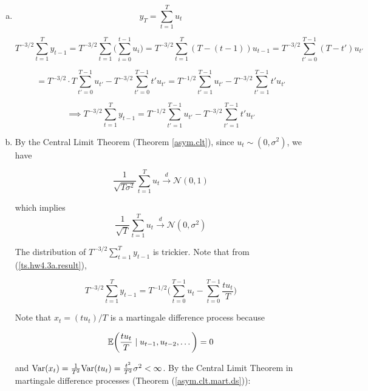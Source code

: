 \begin{enumerate}[(a)]

\item 

\[
y_T = \sum_{t=1}^T u_t
\]

\[
T^{-3/2} \sum_{t=1}^T y_{t-1} = T^{-3/2} \sum_{t=1}^T \bigg( \sum_{i=0}^{t-1} u_i \bigg)  = T^{-3/2} \sum_{t=1}^T(T - (t - 1)) u_{t-1} = T^{-3/2} \sum_{t'=0}^{T-1} (T - t') u_{t'}
\]

\[ 
 =T^{-3/2} \cdot  T \sum_{t'=0}^{T- 1} u_{t'} -  T^{-3/2} \sum_{t'=0}^{T - 1} t' u_{t'}   =T^{-1/2}  \sum_{t'=1}^{T- 1} u_{t'} -  T^{-3/2} \sum_{t'=1}^{T - 1} t' u_{t'} 
\]

\begin{equation} \label{ts.hw4.3a.result}
\implies \boxed{ T^{-3/2} \sum_{t=1}^T y_{t-1} =T^{-1/2}  \sum_{t'=1}^{T- 1} u_{t'} -  T^{-3/2} \sum_{t'=1}^{T - 1} t' u_{t'} }
\end{equation}

\item 

By the Central Limit Theorem (Theorem \ref{asym.clt}), since \(u_t \sim (0, \sigma^2)\),  we have

\[
\frac{1}{\sqrt{T\sigma^2}} \sum_{t=1}^T u_t \xrightarrow{d} \mathcal{N}(0,1)
\]

which implies
\begin{equation}\label{ts.hw4.3b.clt}
\boxed{
 \frac{1}{\sqrt{T}} \sum_{t=1}^T u_t \xrightarrow{d} \mathcal{N}(0,\sigma^2)}
\end{equation}

The distribution of \(T^{-3/2}\sum_{t=1}^T y_{t-1}\) is trickier. Note that from (\ref{ts.hw4.3a.result}),

\[
T^{-3/2}\sum_{t=1}^T y_{t-1} = T^{-1/2}\bigg( \sum_{t=0}^{T-1}   u_{t} -  \sum_{t=0}^{T-1} \frac{ t u_{t}}{T}  \bigg)
\]

Note that \(x_t = ( t u_{t})/T \) is a martingale difference process because 

\[
\mathbb{E} \bigg(  \frac{ t u_{t}}{T}  \mid u_{t-1}, u_{t-2}, \ldots \bigg) = 0 
\]

and \(\mathrm{Var}(x_t) = \frac{1}{T^2} \mathrm{Var}(t u_t) = \frac{t^2}{T^2} \sigma^2 < \infty \). By the Central Limit Theorem in martingale difference processes (Theorem (\ref{asym.clt.mart.ds})):

\noindent{}
\end{enumerate}
